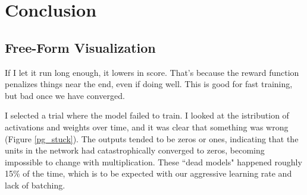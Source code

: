 \documentclass[12pt,a4paper]{article}
\begin{document}


\section{Conclusion}
%
\subsection*{Free-Form Visualization}
%
If I let it run long enough, it lowers in score. That's because the reward function penalizes things near the end, even if doing well. This is good for fast training, but bad once we have converged.


I selected a trial where the model failed to train. I looked at the istribution of activations and weights over time, and it was clear that something was wrong (Figure \ref{pg_stuck}). The outputs tended to be zeros or ones, indicating that the units in the network had catastrophically converged to zeros, becoming impossible to change with multiplication. These ``dead models" happened roughly 15\% of the time, which is to be expected with our aggressive learning rate and lack of batching.
 
\end{document}
